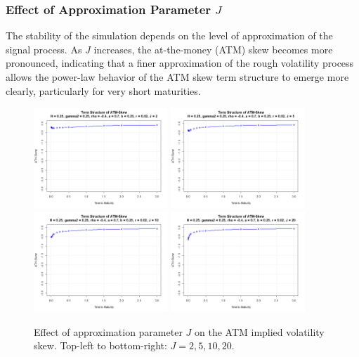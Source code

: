 \subsubsection*{Effect of Approximation Parameter $J$}
\begin{minipage}{\textwidth}
The stability of the simulation depends on the level of approximation of the signal process. As $J$ increases, the at-the-money (ATM) skew becomes more pronounced, indicating that a finer approximation of the rough volatility process allows the power-law behavior of the ATM skew term structure to emerge more clearly, particularly for very short maturities.
\begin{figure}[H]
    \centering
    \includegraphics[width=0.45\textwidth]{figures/5.2 Individual Parameter Effects/J=2_atm_skew.png}
    \includegraphics[width=0.45\textwidth]{figures/5.2 Individual Parameter Effects/J=5_atm_skew.png}
    \includegraphics[width=0.45\textwidth]{figures/5.2 Individual Parameter Effects/J=10_atm_skew.png}
    \includegraphics[width=0.45\textwidth]{figures/5.2 Individual Parameter Effects/J=20_atm_skew.png}
    \caption{Effect of approximation parameter $J$ on the ATM implied volatility skew. Top-left to bottom-right: $J=2,5,10,20$.}
    \label{fig:J_effect}
\end{figure}
\end{minipage}


